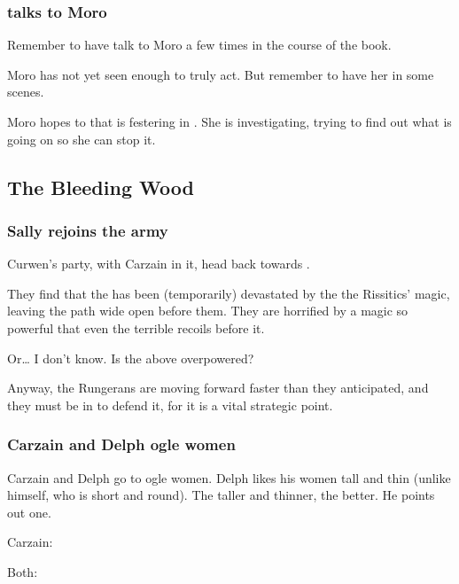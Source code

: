 \subsubsection{\Tiroco{} talks to Moro}
Remember to have \Tiroco{} talk to Moro \Cobrel{} a few times in the course of the book.

Moro has not yet seen enough to truly act. But remember to have her in some scenes. 

Moro hopes to  that is festering in \Malcur. 
She is investigating, trying to find out what is going on so she can stop it. 








\subsection{The Bleeding Wood}
\subsubsection{Sally rejoins the army}
Curwen's party, with Carzain in it, head back towards \Forclin. 

They find that the \Wylde{} has been (temporarily) devastated by the the Rissitics' magic, leaving the path wide open before them. They are horrified by a magic so powerful that even the terrible \Wylde{} recoils before it. 

Or\ldots{} I don't know. Is the above overpowered? 

Anyway, the Rungerans are moving forward faster than they anticipated, and they must be in \Forclin{} to defend it, for it is a vital strategic point. 





\subsubsection{Carzain and Delph ogle women}
Carzain and Delph go to ogle women. Delph likes his women tall and thin (unlike himself, who is short and round). The taller and thinner, the better. He points out one. 

Carzain: 

Both: 





